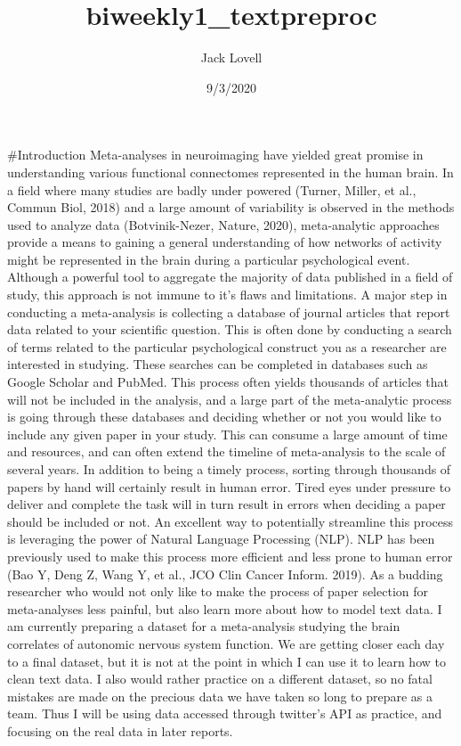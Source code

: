 \documentclass[
]{article}
\title{biweekly1\_textpreproc}
\author{Jack Lovell}
\date{9/3/2020}
\begin{document}
\maketitle

\#Introduction Meta-analyses in neuroimaging have yielded great promise
in understanding various functional connectomes represented in the human
brain. In a field where many studies are badly under powered (Turner,
Miller, et al., Commun Biol, 2018) and a large amount of variability is
observed in the methods used to analyze data (Botvinik-Nezer, Nature,
2020), meta-analytic approaches provide a means to gaining a general
understanding of how networks of activity might be represented in the
brain during a particular psychological event. Although a powerful tool
to aggregate the majority of data published in a field of study, this
approach is not immune to it's flaws and limitations. A major step in
conducting a meta-analysis is collecting a database of journal articles
that report data related to your scientific question. This is often done
by conducting a search of terms related to the particular psychological
construct you as a researcher are interested in studying. These searches
can be completed in databases such as Google Scholar and PubMed. This
process often yields thousands of articles that will not be included in
the analysis, and a large part of the meta-analytic process is going
through these databases and deciding whether or not you would like to
include any given paper in your study. This can consume a large amount
of time and resources, and can often extend the timeline of
meta-analysis to the scale of several years. In addition to being a
timely process, sorting through thousands of papers by hand will
certainly result in human error. Tired eyes under pressure to deliver
and complete the task will in turn result in errors when deciding a
paper should be included or not. An excellent way to potentially
streamline this process is leveraging the power of Natural Language
Processing (NLP). NLP has been previously used to make this process more
efficient and less prone to human error (Bao Y, Deng Z, Wang Y, et al.,
JCO Clin Cancer Inform. 2019). As a budding researcher who would not
only like to make the process of paper selection for meta-analyses less
painful, but also learn more about how to model text data. I am
currently preparing a dataset for a meta-analysis studying the brain
correlates of autonomic nervous system function. We are getting closer
each day to a final dataset, but it is not at the point in which I can
use it to learn how to clean text data. I also would rather practice on
a different dataset, so no fatal mistakes are made on the precious data
we have taken so long to prepare as a team. Thus I will be using data
accessed through twitter's API as practice, and focusing on the real
data in later reports.
\end{document}
